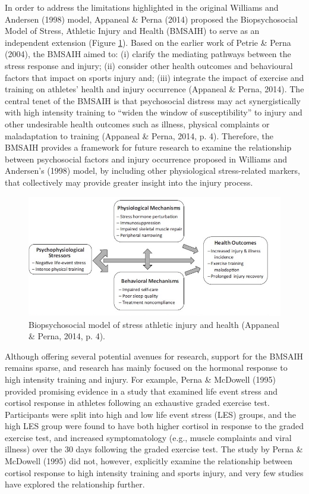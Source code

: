 \documentclass[
  english,
  man,floatsintext]{apa6}
\begin{document}
In order to address the limitations highlighted in the original Williams and Andersen (1998) model, Appaneal \& Perna (2014)
proposed the Biopsychosocial Model of Stress, Athletic Injury and Health (BMSAIH) to serve as an independent extension (Figure \ref{fig:pernamodel}).
Based on the earlier work of Petrie \& Perna (2004), the BMSAIH aimed to:
(i) clarify the mediating pathways between the stress response and injury;
(ii) consider other health outcomes and behavioural factors that impact on sports injury and;
(iii) integrate the impact of exercise and training on athletes' health and injury occurrence (Appaneal \& Perna, 2014).
The central tenet of the BMSAIH is that psychosocial distress may act synergistically with high intensity training to \enquote{widen the window of susceptibility} to injury and other undesirable health outcomes such as illness, physical complaints or maladaptation to training (Appaneal \& Perna, 2014, p. 4).
Therefore, the BMSAIH provides a framework for future research to examine the relationship between psychosocial factors and injury occurrence proposed in Williams and Andersen's (1998) model, by including other physiological stress-related markers, that collectively may provide greater insight into the injury process.

\begin{figure}

{\centering \includegraphics[width=1\linewidth]{figs/lit/bmoi} 

}

\caption{Biopsychosocial model of stress athletic injury and health (Appaneal \& Perna, 2014, p. 4).}\label{fig:pernamodel}
\end{figure}

Although offering several potential avenues for research, support for the BMSAIH remains sparse, and research has mainly focused on the hormonal response to high intensity training and injury.
For example, Perna \& McDowell (1995) provided promising evidence in a study that examined life event stress and cortisol response in athletes following an exhaustive graded exercise test.
Participants were split into high and low life event stress (LES) groups, and the high LES group were found to have both higher cortisol in response to the graded exercise test, and increased symptomatology (e.g., muscle complaints and viral illness) over the 30 days following the graded exercise test.
The study by Perna \& McDowell (1995) did not, however, explicitly examine the relationship between cortisol response to high intensity training and sports injury, and very few studies have explored the relationship further.
\end{document}
